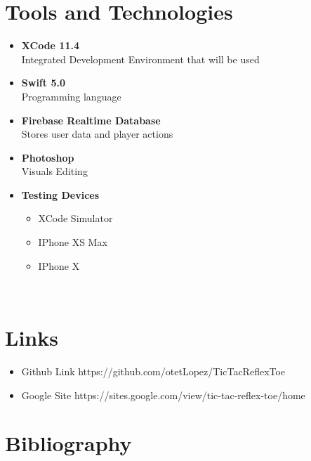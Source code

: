 \documentclass{article}
\begin{document}
\section{Tools and Technologies}
    \begin{itemize}
        \item \textbf{XCode 11.4}\\Integrated Development Environment that will be used
        \item \textbf{Swift 5.0}\\Programming language
        \item \textbf{Firebase Realtime Database}\\Stores user data and player actions
        \item \textbf{Photoshop}\\Visuals Editing
        
        \item \textbf{Testing Devices}
            \begin{itemize}
            \item XCode Simulator
            \item IPhone XS Max
            \item IPhone X
            \end{itemize}
    \end{itemize}
~\\
\section{Links}
\begin{itemize}
    \item Github Link  https://github.com/otetLopez/TicTacReflexToe
    \item Google Site 
    https://sites.google.com/view/tic-tac-reflex-toe/home
\end{itemize}
\newpage
\section{Bibliography}
\end{document}
